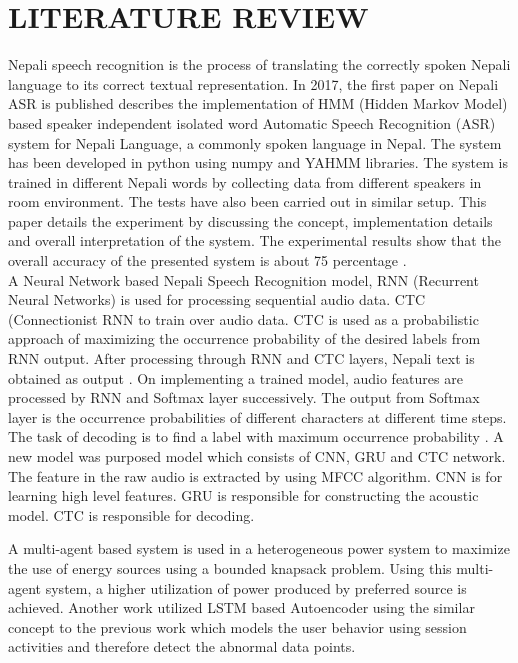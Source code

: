 \chapter{LITERATURE REVIEW}

Nepali speech recognition is the process of translating the correctly spoken Nepali language to its correct textual representation.  In 2017, the first paper on Nepali ASR is published describes the implementation of HMM (Hidden Markov Model) based speaker independent isolated word Automatic Speech Recognition (ASR) system for Nepali Language, a commonly spoken language in Nepal. The system has been developed in python using numpy and YAHMM libraries. The system is trained in different Nepali words by collecting data from different speakers in room environment. The tests have also been carried out in similar setup. This paper details the experiment by discussing the concept, implementation details and overall interpretation of the system. The experimental results show that the overall accuracy of the presented system is about 75 percentage \cite{ssarma2017hmm}. 
\\
A Neural Network based Nepali Speech Recognition model, RNN (Recurrent Neural Networks) is used for processing sequential audio data. CTC (Connectionist RNN to train over audio data. CTC is used as a probabilistic approach of maximizing the occurrence probability of the desired labels from RNN output. After processing through RNN and CTC layers, Nepali text is obtained as output \cite{paribesh2019nepali}. On implementing a trained model, audio features are processed by RNN and Softmax layer successively. The output from Softmax layer is the occurrence probabilities of different characters at different time steps. The task of decoding is to find a label with maximum occurrence probability \cite{paribesh2019nepali}. 
A new model was purposed model which consists of CNN, GRU and CTC network\cite{bhatta2020nepali}. The feature in the raw audio is extracted by using MFCC algorithm. CNN
is for learning high level features. GRU is responsible for constructing the acoustic
model. CTC is responsible for decoding. 


A multi-agent based
system is used in a heterogeneous power system to maximize the use of energy sources using a bounded knapsack problem. Using this multi-agent system, a higher utilization of power
produced by preferred source is achieved\cite{shrestha2021multi}.
Another work \cite{sharma2020user} utilized LSTM based Autoencoder
using the similar concept to the previous work which models
the user behavior using session activities and therefore detect
the abnormal data points.




